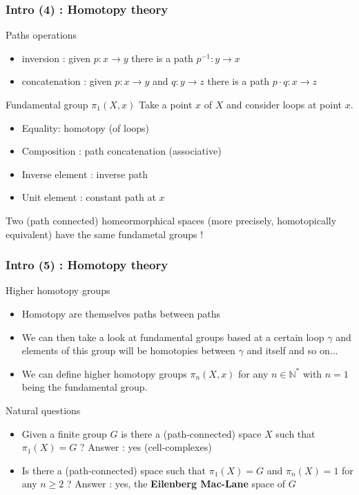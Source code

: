 \documentclass{beamer}
\begin{document}
\begin{frame}
    \frametitle{Intro (4) : Homotopy theory}
    \begin{exampleblock}{Paths operations}
        \begin{itemize}
            \item inversion : given $p : x \rightarrow y$ there is a path $p^{-1} : y \rightarrow x$
            \item concatenation : given $p : x \rightarrow y$ and $ q : y \rightarrow z$ there is a path $ p \cdot q : x \rightarrow z$
        \end{itemize}
    \end{exampleblock}
    \pause
    \begin{alertblock}{Fundamental group $\pi_1(X,x)$
        }
        Take a point $x$ of $X$ and consider loops at point $x$.
        \begin{itemize}
            \item Equality: homotopy (of loops)
            \item Composition : path concatenation (associative)
            \item Inverse element : inverse path
            \item Unit element : constant path at $x$
        \end{itemize}
        Two (path connected) homeormorphical spaces (more precisely, homotopically equivalent) have the same fundametal groups !
    \end{alertblock}
\end{frame}
\begin{frame}
    \frametitle{Intro (5) : Homotopy theory}
    \begin{exampleblock}{Higher homotopy groups}
        \begin{itemize}
            \item Homotopy are themselves paths between paths
            \pause
            \item We can then take a look at fundamental groups based at a certain loop $\gamma$ and elements of this group will be homotopies between $\gamma$ and itself and so on...
            \pause
            \item  We can define higher homotopy groups $\pi_n(X,x)$ for any $n \in \mathbb{N}^*$ with $n=1$ being the fundamental group.
        \end{itemize}
    \end{exampleblock}
    \pause
    \begin{exampleblock}{Natural questions}
        \begin{itemize}
            \item Given a finite group $G$ is there a (path-connected) space $X$ such that $\pi_1(X) = G$ ?
            \pause
            Answer : yes (cell-complexes)
            \pause
            \item Is there a (path-connected) space such that $\pi_1(X)=G$ and $\pi_n(X)=1$ for any $n\geq 2$ ?
            \pause Answer : yes, the \textbf{Eilenberg Mac-Lane} space of $G$ 
        \end{itemize}
    \end{exampleblock}
\end{frame}
\end{document}
